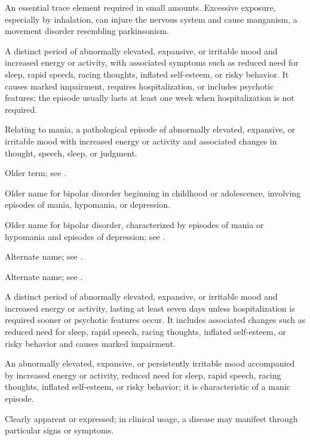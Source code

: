  An essential trace element required in small amounts. Excessive exposure, especially by inhalation, can injure the nervous system and cause manganism, a movement disorder resembling parkinsonism.

 A distinct period of abnormally elevated, expansive, or irritable mood and increased energy or activity, with associated symptoms such as reduced need for sleep, rapid speech, racing thoughts, inflated self-esteem, or risky behavior. It causes marked impairment, requires hospitalization, or includes psychotic features; the episode usually lasts at least one week when hospitalization is not required.

 Relating to mania, a pathological episode of abnormally elevated, expansive, or irritable mood with increased energy or activity and associated changes in thought, speech, sleep, or judgment.

 Older term; see .

 Older name for bipolar disorder beginning in childhood or adolescence, involving episodes of mania, hypomania, or depression.

 Older name for bipolar disorder, characterized by episodes of mania or hypomania and episodes of depression; see .

 Alternate name; see .

 Alternate name; see .

 A distinct period of abnormally elevated, expansive, or irritable mood and increased energy or activity, lasting at least seven days unless hospitalization is required sooner or psychotic features occur. It includes associated changes such as reduced need for sleep, rapid speech, racing thoughts, inflated self-esteem, or risky behavior and causes marked impairment.

 An abnormally elevated, expansive, or persistently irritable mood accompanied by increased energy or activity, reduced need for sleep, rapid speech, racing thoughts, inflated self-esteem, or risky behavior; it is characteristic of a manic episode.

 Clearly apparent or expressed; in clinical usage, a disease may manifest through particular signs or symptoms.

